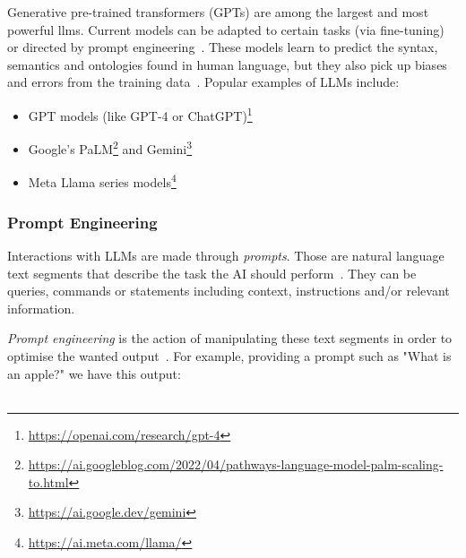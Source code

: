 Generative pre-trained transformers (GPTs) are among the largest and most powerful \glspl{llm}.
Current models can be adapted to certain tasks (via fine-tuning) or directed by prompt
engineering~\cite{brown2020fewshot}. These models learn to predict the syntax, semantics and
ontologies found in human language, but they also pick up biases and errors from the training
data~\cite{manning2022reasoning}. Popular examples of LLMs include:
\begin{itemize}
	\item GPT models (like GPT-4 or ChatGPT)\footnote{\url{https://openai.com/research/gpt-4}}
	\item Google's
	      PaLM\footnote{\url{https://ai.googleblog.com/2022/04/pathways-language-model-palm-scaling-to.html}}
	      and Gemini\footnote{\url{https://ai.google.dev/gemini}}
	\item Meta Llama series models\footnote{\url{https://ai.meta.com/llama/}}
\end{itemize}

\subsubsection{Prompt Engineering}\label{subsubsec:PromptEngineering}
Interactions with LLMs are made through \textit{prompts}. Those are natural language text segments
that describe the task the AI should perform~\cite{radford2019language}. They can be queries,
commands or statements including context, instructions and/or relevant information.

\textit{Prompt engineering} is the action of manipulating these text segments in order to optimise
the wanted output~\cite{wahle2024paraphrase}. For example, providing a prompt such as "What is an
apple?" we have this output:\\

\\

